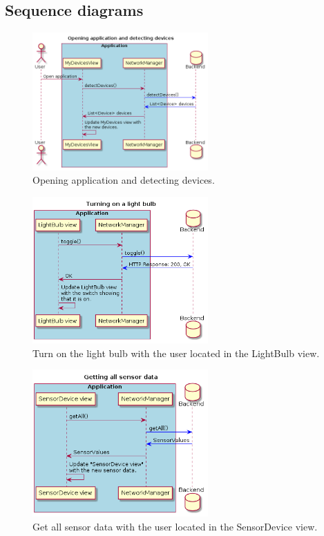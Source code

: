 \documentclass[a4paper]{article}
\begin{document}
	
	\subsection{Sequence diagrams}
	
	\begin{figure}[H]
    \centering
    \includegraphics[width=0.6\textwidth]{seq.png}
    \caption{Opening application and detecting devices.}
    \label{fig:seq}
\end{figure}

\begin{figure}[H]
    \centering
    \includegraphics[width=0.6\textwidth]{seq1.png}
    \caption{Turn on the light bulb with the user located in the LightBulb view.}
    \label{fig:seq1}
\end{figure}

\begin{figure}[H]
    \centering
    \includegraphics[width=0.6\textwidth]{seq2.png}
    \caption{Get all sensor data with the user located in the SensorDevice view.}
    \label{fig:seq2}
\end{figure}
\end{document}

